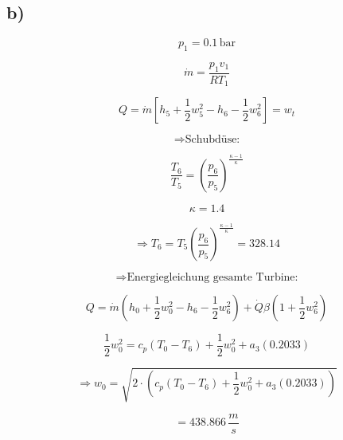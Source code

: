 

\subsection*{b)}

\[
p_1 = 0.1 \, \text{bar}
\]

\[
\dot{m} = \frac{p_1 v_1}{R T_1}
\]

\[
Q = \dot{m} \left[ h_5 + \frac{1}{2} w_5^2 - h_6 - \frac{1}{2} w_6^2 \right] = w_t
\]

\[
\Rightarrow \text{Schubdüse:}
\]

\[
\frac{T_6}{T_5} = \left( \frac{p_6}{p_5} \right)^{\frac{\kappa - 1}{\kappa}}
\]

\[
\kappa = 1.4
\]

\[
\Rightarrow T_6 = T_5 \left( \frac{p_6}{p_5} \right)^{\frac{\kappa - 1}{\kappa}} = 328.14
\]

\[
\Rightarrow \text{Energiegleichung gesamte Turbine:}
\]

\[
Q = \dot{m} \left( h_0 + \frac{1}{2} w_0^2 - h_6 - \frac{1}{2} w_6^2 \right) + \dot{Q} \beta \left( 1 + \frac{1}{2} w_6^2 \right)
\]

\[
\frac{1}{2} w_0^2 = c_p (T_0 - T_6) + \frac{1}{2} w_0^2 + a_3 (0.2033)
\]

\[
\Rightarrow w_0 = \sqrt{2 \cdot \left( c_p (T_0 - T_6) + \frac{1}{2} w_0^2 + a_3 (0.2033) \right)}
\]

\[
= 438.866 \, \frac{m}{s}
\]